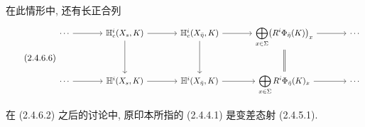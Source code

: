 在此情形中, 还有长正合列
\begin{equation}\tag{2.4.6.6}
\resizebox{\textwidth}{!}{%
\begin{tikzcd}[ampersand replacement=\&, column sep=large, row sep=large]
\cdots \arrow[r]
  \& \mathbb H^i_c(X_s,K) \arrow[r] \arrow[d]
  \& \mathbb H^i_c(X_{\bar\eta},K) \arrow[r] \arrow[d]
  \& \displaystyle\bigoplus_{x\in\Sigma}
     \bigl(R^i\Phi_{\bar\eta}(K)\bigr)_x
     \arrow[r] \arrow[d, equal]
  \& \cdots \\
\cdots \arrow[r]
  \& \mathbb H^i(X_s,K) \arrow[r]
  \& \mathbb H^i(X_{\bar\eta},K) \arrow[r]
  \& \displaystyle\bigoplus_{x\in\Sigma}
     R^i\Phi_{\bar\eta}(K)_x \arrow[r]
  \& \cdots
\end{tikzcd}}
\end{equation}

在 (2.4.6.2) 之后的讨论中, 原印本所指的 (2.4.4.1) 是变差态射 (2.4.5.1).
